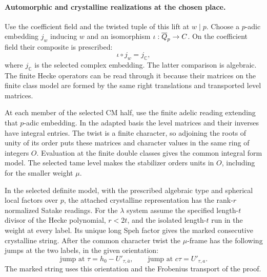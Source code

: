 \paragraph{Automorphic and crystalline realizations at the chosen place.}
Use the coefficient field and the twisted tuple of this
lift at \(w\mid p\). Choose a \(p\)-adic embedding \(j_w\) inducing \(w\) and an isomorphism \(\iota:\overline{Q}_p\to C\). On the coefficient field their composite is prescribed:
\[
 \iota\circ j_w=j_{\mathbb C},
\]
where \(j_{\mathbb C}\) is the selected complex embedding. The latter comparison is algebraic.
The finite Hecke operators can be read through it because
their matrices on the finite class model are formed by
the same right translations and transported level
matrices.

At each member of the selected CM half, use
the finite adelic reading extending that \(p\)-adic
embedding. In the adapted basis the level matrices and
their inverses have integral entries. The twist is a
finite character, so adjoining the roots of unity of its
order puts these matrices and character values in the
same ring of integers \(O\). Evaluation at the finite
double classes gives the common integral form model.
The selected tame level makes the stabilizer orders units
in \(O\), including for the smaller weight \(\mu\).
\label{cor:lift-frame-galois-1}

\begin{proposition}
\label{prop:lift-frame-crystalline-reading}
In the selected definite model, with the prescribed algebraic
type and spherical local factors over \(p\), the attached
crystalline representation has the rank-\(r\) normalized
Satake readings. For the \(\lambda\) system assume the specified
length-\(t\) divisor of the Hecke polynomial, \(r<2t\), and the
isolated length-\(t\) run in the weight at every label. Its
unique long Speh factor gives the marked consecutive crystalline
string. After the common character twist the \(\mu\)-frame has the following jumps at the two labels, in the given orientation:
\[
 \text{jump at }\tau=h_0-U'_{\tau,\bar a},\qquad\text{jump at }c\tau=U'_{\tau,a}.
\]
The marked string uses this orientation and the Frobenius transport of the proof.
\end{proposition}

